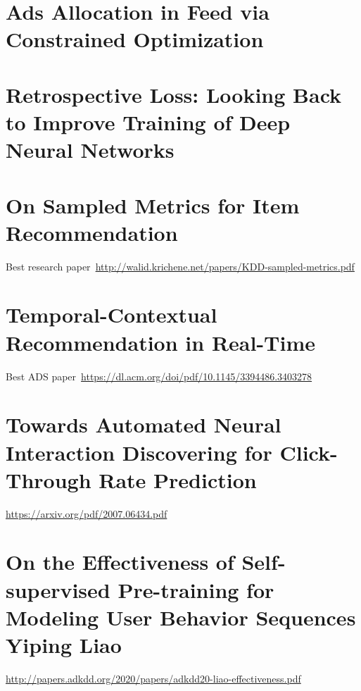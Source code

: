 \documentclass[11pt]{article}
\begin{document}
\section{Ads Allocation in Feed via Constrained Optimization~\cite{yan2020ads}}

\section{Retrospective Loss: Looking Back to Improve Training of Deep Neural Networks~\cite{jandial2020retrospective}}

\section{On Sampled Metrics for Item Recommendation}
Best research paper~\url{http://walid.krichene.net/papers/KDD-sampled-metrics.pdf}

\section{Temporal-Contextual Recommendation in Real-Time}
Best ADS paper~\url{https://dl.acm.org/doi/pdf/10.1145/3394486.3403278}

\section{Towards Automated Neural Interaction Discovering for Click-Through Rate Prediction}
\url{https://arxiv.org/pdf/2007.06434.pdf}

\section{On the Effectiveness of Self-supervised Pre-training for Modeling User Behavior Sequences
Yiping Liao}
\url{http://papers.adkdd.org/2020/papers/adkdd20-liao-effectiveness.pdf}


\newpage


\end{document}
